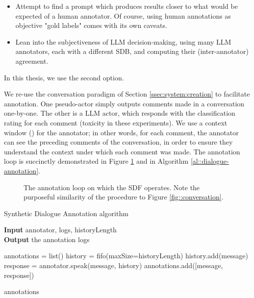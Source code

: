 \begin{itemize}
	\item Attempt to find a prompt which produces results closer to what would be expected of a human annotator. Of course, using human annotations as objective "gold labels" comes with its own caveats.
	\item Lean into the subjectiveness of LLM decision-making, using many LLM annotators, each with a different \ac{SDB}, and computing their (inter-annotator) agreement.
\end{itemize}

In this thesis, we use the second option.

We re-use the conversation paradigm of Section \ref{ssec:system:creation} to facilitate annotation. One pseudo-actor simply outputs comments made in a conversation one-by-one. The other is a LLM actor, which responds with the classification rating for each comment (toxicity in these experiments).  We use a context window  () for the annotator; in other words, for each comment, the annotator can see the  preceding comments of the conversation, in order to ensure they understand the context under which each comment was made. The annotation loop is succinctly demonstrated in Figure \ref{fig::annotation} and in Algorithm \ref{al::dialogue-annotation}.

\begin{figure}
	\centering
	
	\caption{The annotation loop on which the \ac{SDF} operates. Note the purposeful similarity of the procedure to Figure \ref{fig::conversation}.}
	\label{fig::annotation}
\end{figure}

\begin{algorithm}
	\caption{Synthetic Dialogue Annotation algorithm} 
	\label{al::dialogue-annotation}
	\hspace*{\algorithmicindent} \textbf{Input} annotator, logs, historyLength\\
	\hspace*{\algorithmicindent} \textbf{Output} the annotation logs
	\begin{algorithmic}[1]	
		\State annotations = list()
		\State history = fifo(maxSize=historyLength)
		\State 
		\State history.add(message)
		\State response = annotator.speak(message, history)
		\State annotations.add([message, response])
		\EndFor
		
		\State \Return annotations
	\end{algorithmic} 
\end{algorithm}


